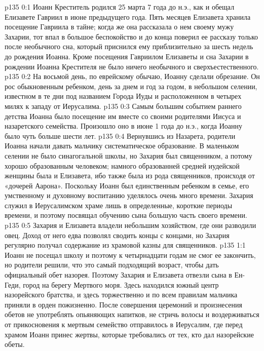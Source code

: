\author{Комиссия срединников}
\vs p135 0:1 Иоанн Креститель родился 25 марта 7 года до н.э., как и обещал Елизавете Гавриил в июне предыдущего года. Пять месяцев Елизавета хранила посещение Гавриила в тайне; когда же она рассказала о нем своему мужу Захарии, тот впал в большое беспокойство и до конца поверил ее рассказу только после необычного сна, который приснился ему приблизительно за шесть недель до рождения Иоанна. Кроме посещения Гавриилом Елизаветы и сна Захарии в рождении Иоанна Крестителя не было ничего необычного и сверхъестественного.
\vs p135 0:2 На восьмой день, по еврейскому обычаю, Иоанну сделали обрезание. Он рос обыкновенным ребенком, день за днем и год за годом, в небольшом селении, известном в те дни под названием Города Иуды и расположенном в четырех милях к западу от Иерусалима.
\vs p135 0:3 Самым большим событием раннего детства Иоанна было посещение им вместе со своими родителями Иисуса и назаретского семейства. Произошло оно в июне 1 года до н.э., когда Иоанну было чуть больше шести лет.
\vs p135 0:4 Вернувшись из Назарета, родители Иоанна начали давать мальчику систематическое образование. В маленьком селении не было синагогальной школы, но Захария был священником, а потому хорошо образованным человеком; намного образованней средней иудейской женщины была и Елизавета, ибо также была из рода священников, происходя от «дочерей Аарона». Поскольку Иоанн был единственным ребенком в семье, его умственному и духовному воспитанию уделялось очень много времени. Захария служил в Иерусалимском храме лишь в определенные, короткие периоды времени, и поэтому посвящал обучению сына большую часть своего времени.
\vs p135 0:5 Захария и Елизавета владели небольшим хозяйством, где они разводили овец. Доход от него едва позволял сводить концы с концами, но Захария регулярно получал содержание из храмовой казны для священников.
\vs p135 1:1 Иоанн не посещал школу и поэтому к четырнадцати годам не смог ее закончить, но родители решили, что это самый подходящий возраст, чтобы дать официальный обет назорея. Поэтому Захария и Елизавета отвезли сына в Ен\hyp{}Геди, город на берегу Мертвого моря. Здесь находился южный центр назорейского братства, и здесь торжественно и по всем правилам мальчика приняли в орден пожизненно. После совершения церемоний и произнесения обетов не употреблять опьяняющих напитков, не стричь волосы и воздерживаться от прикосновения к мертвым семейство отправилось в Иерусалим, где перед храмом Иоанн принес жертвы, которые требовались от тех, кто дал назорейские обеты.
